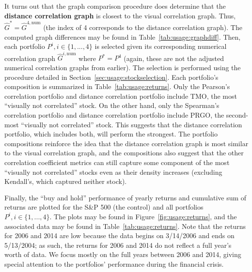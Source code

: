 \newpage
It turns out that the graph comparison procedure does determine that the 
\textbf{distance correlation graph} is closest to the visual correlation graph. 
Thus, $\hat{G}^* = \hat{G}^{4,\text{num}}$ (the index of 4 corresponds to the 
distance correlation graph). 
The computed graph differences may be found in Table~\ref{tab:usage:graphdiff}.
Then, each portfolio $P^i, i\in \{1,...,4\}$ is selected given its 
corresponding numerical correlation graph $\hat{G}^{i,\text{num}}$ where $P^* = 
P^4$ (again, these are not the adjusted numerical correlation graphs from 
earlier). The selection is performed using the procedure detailed in 
Section~\ref{sec:usage:stockselection}. Each portfolio's 
composition is summarized in Table~\ref{tab:usage:returns}. Only the Pearson's 
correlation portfolio and distance correlation portfolio include TMO, the most 
``visually not correlated'' stock. On the other hand, only the Spearman's 
correlation portfolio and distance correlation portfolio include 
PRGO, the second-most ``visually not correlated'' stock. This suggests that the 
distance correlation portfolio, which includes both, will perform the strongest.
The portfolio compositions reinforce the idea that the distance correlation 
graph is most similar to the visual correlation graph, and 
the compositions also suggest that the other correlation coefficient metrics 
can still capture some component of the most ``visually not correlated'' stocks 
even as their density increases (excluding Kendall's, which captured neither 
stock). 

Finally, the ``buy and hold'' performance of yearly returns and cumulative 
sum of returns are plotted for the S\&P 500 (the control) and
all portfolios $P^i, i \in \{1,...,4\}$. The plots may be found in 
Figure~\ref{fig:usage:returns}, and the associated 
data may be found in Table~\ref{tab:usage:returns}. Note 
that the returns for 2006 and 2014 are low because the data begins 
on 3/14/2006 and ends on 5/13/2004; as such, the returns for 2006 and 2014 do 
not reflect a full year's worth of data. We focus mostly on the 
full years between 2006 and 2014, giving special attention to the portfolios' 
performance during the financial crisis. 

